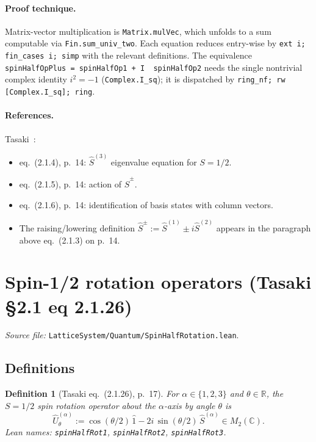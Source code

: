 \documentclass[a4paper,11pt]{article}
\newtheorem{definition}[theorem]{Definition}
\begin{document}
\paragraph{Proof technique.}
Matrix-vector multiplication is \texttt{Matrix.mulVec}, which unfolds to
a sum computable via \texttt{Fin.sum\_univ\_two}. Each equation reduces
entry-wise by \texttt{ext i; fin\_cases i; simp} with the relevant
definitions. The equivalence
\texttt{spinHalfOpPlus = spinHalfOp1 + I \textbullet\ spinHalfOp2} needs
the single nontrivial complex identity $i^2 = -1$ (\texttt{Complex.I\_sq});
it is dispatched by \texttt{ring\_nf; rw [Complex.I\_sq]; ring}.

\paragraph{References.}
Tasaki~\cite{Tasaki:QMB}:
\begin{itemize}
  \item eq.~(2.1.4), p.~14: $\hat S^{(3)}$ eigenvalue equation
    for $S = 1/2$.
  \item eq.~(2.1.5), p.~14: action of $\hat S^\pm$.
  \item eq.~(2.1.6), p.~14: identification of basis states with column
    vectors.
  \item The raising/lowering definition $\hat S^\pm := \hat S^{(1)}
    \pm i \hat S^{(2)}$ appears in the paragraph above eq.~(2.1.3) on
    p.~14.
\end{itemize}

\section{Spin-1/2 rotation operators (Tasaki §2.1 eq 2.1.26)}
\label{sec:spinhalfrot}

\emph{Source file:} \texttt{LatticeSystem/Quantum/SpinHalfRotation.lean}.

\subsection{Definitions}

\begin{definition}[Tasaki eq.~(2.1.26), p.~17]
For $\alpha \in \{1, 2, 3\}$ and $\theta \in \mathbb{R}$, the
$S = 1/2$ spin rotation operator about the $\alpha$-axis by angle
$\theta$ is
\[
  \hat U^{(\alpha)}_\theta
    := \cos(\theta/2)\,\hat 1 - 2i\,\sin(\theta/2)\,\hat S^{(\alpha)}
    \in M_2(\mathbb{C}).
\]
Lean names: \texttt{spinHalfRot1}, \texttt{spinHalfRot2}, \texttt{spinHalfRot3}.
\end{definition}
\end{document}
